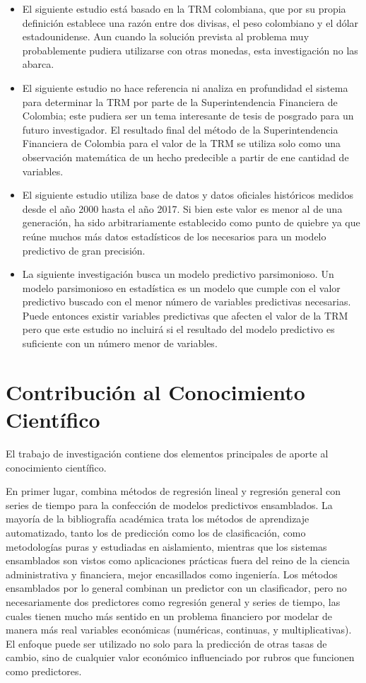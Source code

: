 \begin{itemize}
	\item El siguiente estudio está basado en la TRM colombiana, que por su propia definición establece una razón entre dos divisas, el peso colombiano y el dólar estadounidense. Aun cuando la solución prevista al problema muy probablemente pudiera utilizarse con otras monedas, esta investigación no las abarca.
	\item El siguiente estudio no hace referencia ni analiza en profundidad el sistema para determinar la TRM por parte de la Superintendencia Financiera de Colombia; este pudiera ser un tema interesante de tesis de posgrado para un futuro investigador. El resultado final del método de la Superintendencia Financiera de Colombia para el valor de la TRM se utiliza solo como una observación matemática de un hecho predecible a partir de ene cantidad de variables.
	\item El siguiente estudio utiliza base de datos y datos oficiales históricos medidos desde el año 2000 hasta el año 2017. Si bien este valor es menor al de una generación, ha sido arbitrariamente establecido como punto de quiebre ya que reúne muchos más datos estadísticos de los necesarios para un modelo predictivo de gran precisión.
	\item La siguiente investigación busca un modelo predictivo parsimonioso. Un modelo parsimonioso en estadística es un modelo que cumple con el valor predictivo buscado con el menor número de variables predictivas necesarias. Puede entonces existir variables predictivas que afecten el valor de la TRM pero que este estudio no incluirá si el resultado del modelo predictivo es suficiente con un número menor de variables.
\end{itemize}

\section{Contribución al Conocimiento Científico}
El trabajo de investigación contiene dos elementos principales de aporte al conocimiento científico.

En primer lugar, combina métodos de regresión lineal y regresión general con series de tiempo para la confección de modelos predictivos ensamblados. La mayoría de la bibliografía académica trata los métodos de aprendizaje automatizado, tanto los de predicción como los de clasificación, como metodologías puras y estudiadas en aislamiento, mientras que los sistemas ensamblados son vistos como aplicaciones prácticas fuera del reino de la ciencia administrativa y financiera, mejor encasillados como ingeniería. Los métodos ensamblados por lo general combinan un predictor con un clasificador, pero no necesariamente dos predictores como regresión general y series de tiempo, las cuales tienen mucho más sentido en un problema financiero por modelar de manera más real variables económicas (numéricas, continuas, y multiplicativas). El enfoque puede ser utilizado no solo para la predicción de otras tasas de cambio, sino de cualquier valor económico influenciado por rubros que funcionen como predictores.  

